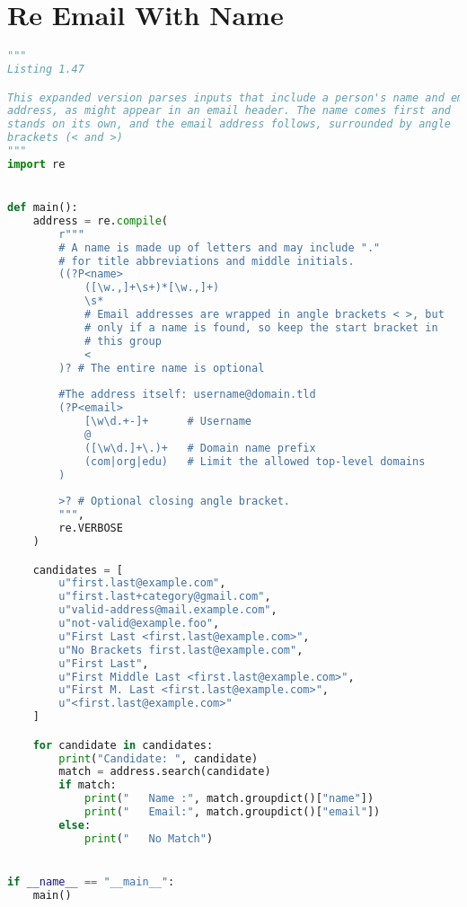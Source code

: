 \documentclass[a4paper,landscape]{report}
\begin{document}
\section{Re Email With Name}
\begin{lstlisting}[language=Python]
"""
Listing 1.47

This expanded version parses inputs that include a person's name and email
address, as might appear in an email header. The name comes first and
stands on its own, and the email address follows, surrounded by angle
brackets (< and >)
"""
import re


def main():
    address = re.compile(
        r"""
        # A name is made up of letters and may include "."
        # for title abbreviations and middle initials.
        ((?P<name>
            ([\w.,]+\s+)*[\w.,]+)
            \s*
            # Email addresses are wrapped in angle brackets < >, but
            # only if a name is found, so keep the start bracket in
            # this group
            <
        )? # The entire name is optional
        
        #The address itself: username@domain.tld
        (?P<email>
            [\w\d.+-]+      # Username
            @
            ([\w\d.]+\.)+   # Domain name prefix
            (com|org|edu)   # Limit the allowed top-level domains
        )
        
        >? # Optional closing angle bracket.
        """,
        re.VERBOSE
    )

    candidates = [
        u"first.last@example.com",
        u"first.last+category@gmail.com",
        u"valid-address@mail.example.com",
        u"not-valid@example.foo",
        u"First Last <first.last@example.com>",
        u"No Brackets first.last@example.com",
        u"First Last",
        u"First Middle Last <first.last@example.com>",
        u"First M. Last <first.last@example.com>",
        u"<first.last@example.com>"
    ]

    for candidate in candidates:
        print("Candidate: ", candidate)
        match = address.search(candidate)
        if match:
            print("   Name :", match.groupdict()["name"])
            print("   Email:", match.groupdict()["email"])
        else:
            print("   No Match")


if __name__ == "__main__":
    main()

\end{lstlisting}
\end{document}
